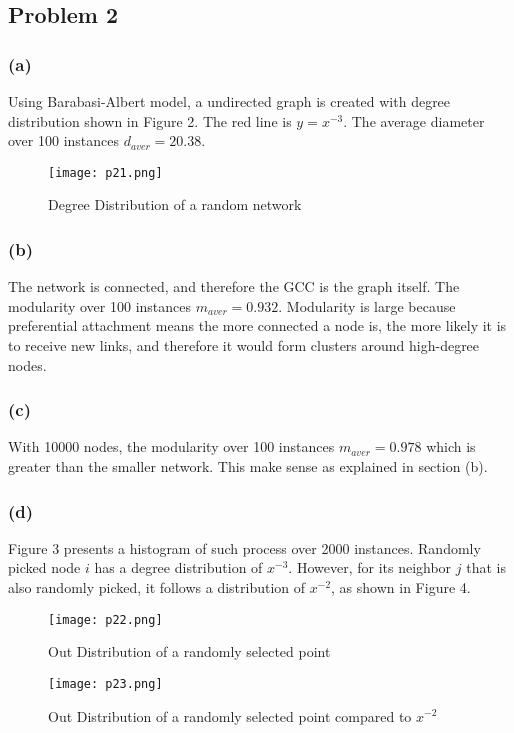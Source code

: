\subsection*{Problem 2}
\subsubsection*{(a)}
Using Barabasi-Albert model, a undirected graph is created with degree distribution shown in Figure 2. The red line is $y = x^{-3}$. The average diameter over 100 instances $d_{aver} = 20.38$.
\vspace{-12pt}
\begin{figure} [h]
	\centering
	\texttt{[image: p21.png]}
	\caption{Degree Distribution of a random network}
\end{figure}
\subsubsection*{(b)}
The network is connected, and therefore the GCC is the graph itself. The modularity over 100 instances $m_{aver} = 0.932$. Modularity is large because preferential attachment means the more connected a node is, the more likely it is to receive new links, and therefore it would form clusters around high-degree nodes.
\subsubsection*{(c)}
With 10000 nodes, the modularity over 100 instances $m_{aver} = 0.978$ which is greater than the smaller network. This make sense as explained in section (b).
\subsubsection*{(d)}
Figure 3 presents a histogram of such process over 2000 instances. Randomly picked node $i$ has a degree distribution of $x^{-3}$. However, for its neighbor $j$ that is also randomly picked, it follows a distribution of $x^{-2}$, as shown in Figure 4.
\vspace{-12pt}
\begin{figure} [h]
	\centering
	\texttt{[image: p22.png]}
	\caption{Out Distribution of a randomly selected point}
\end{figure}
\begin{figure} [t!]
	\centering
	\texttt{[image: p23.png]}
	\caption{Out Distribution of a randomly selected point compared to $x^{-2}$}
\end{figure}


